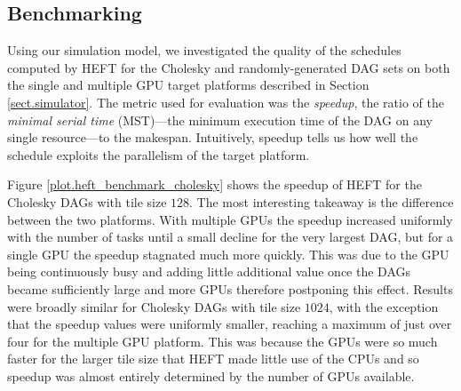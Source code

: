 \documentclass[runningheads]{llncs}
\begin{document}
\subsection{Benchmarking}
\label{subsect.benchmarking}

Using our simulation model, we investigated the quality of the schedules computed by HEFT for the Cholesky and randomly-generated DAG sets on both the single and multiple GPU target platforms described in Section \ref{sect.simulator}. The metric used for evaluation was the {\em speedup}, the ratio of the {\em minimal serial time} (MST)---the minimum execution time of the DAG on any single resource---to the makespan. Intuitively, speedup tells us how well the schedule exploits the parallelism of the target platform.

Figure \ref{plot.heft_benchmark_cholesky} shows the speedup of HEFT for the Cholesky DAGs with tile size $128$. The most interesting takeaway is the difference between the two platforms. With multiple GPUs the speedup increased uniformly with the number of tasks until a small decline for the very largest DAG, but for a single GPU the speedup stagnated much more quickly. This was due to the GPU being continuously busy and adding little additional value once the DAGs became sufficiently large and more GPUs therefore postponing this effect. Results were broadly similar for Cholesky DAGs with tile size $1024$, with the exception that the speedup values were uniformly smaller, reaching a maximum of just over four for the multiple GPU platform. This was because the GPUs were so much faster for the larger tile size that HEFT made little use of the CPUs and so speedup was almost entirely determined by the number of GPUs available. 
\end{document}
